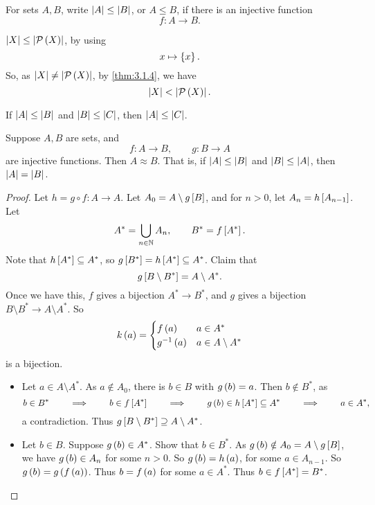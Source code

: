 
\begin{definition}
For sets $ A, B $, write $ \abs{A} \le \abs{B} $, or $ A \le B $, if there is an injective function
$$ f : A \to B. $$
\end{definition}

\begin{note*}
$ \abs{X} \le \abs{\PP\rb{X}} $, by using
$$ x \mapsto \cb{x}. $$
So, as $ \abs{X} \ne \abs{\PP\rb{X}} $, by \ref{thm:3.1.4}, we have
$$ \abs{X} < \abs{\PP\rb{X}}. $$
\end{note*}

\begin{example*}
If $ \abs{A} \le \abs{B} $ and $ \abs{B} \le \abs{C} $, then $ \abs{A} \le \abs{C} $.
\end{example*}

\pagebreak

\begin{theorem}
\label{thm:3.1.6}
Suppose $ A, B $ are sets, and
$$ f : A \to B, \qquad g : B \to A $$
are injective functions. Then $ A \approx B $. That is, if $ \abs{A} \le \abs{B} $ and $ \abs{B} \le \abs{A} $, then $ \abs{A} = \abs{B} $.
\end{theorem}

\begin{proof}
Let $ h = g \circ f : A \to A $. Let $ A_0 = A \setminus g\sb{B} $, and for $ n > 0 $, let $ A_n = h\sb{A_{n - 1}} $. Let
$$ A^* = \bigcup_{n \in \N} A_n, \qquad B^* = f\sb{A^*}. $$
Note that $ h\sb{A^*} \subseteq A^* $, so $ g\sb{B^*} = h\sb{A^*} \subseteq A^* $. Claim that
$$ g\sb{B \setminus B^*} = A \setminus A^*. $$
Once we have this, $ f $ gives a bijection $ A^* \to B^* $, and $ g $ gives a bijection $ B \setminus B^* \to A \setminus A^* $. So
$$ k\rb{a} =
\begin{cases}
f\rb{a} & a \in A^* \\
g^{-1}\rb{a} & a \in A \setminus A^*
\end{cases}
$$
is a bijection.
\begin{itemize}
\item Let $ a \in A \setminus A^* $. As $ a \notin A_0 $, there is $ b \in B $ with $ g\rb{b} = a $. Then $ b \notin B^* $, as
$$ b \in B^* \qquad \implies \qquad b \in f\sb{A^*} \qquad \implies \qquad g\rb{b} \in h\sb{A^*} \subseteq A^* \qquad \implies \qquad a \in A^*, $$
a contradiction. Thus $ g\sb{B \setminus B^*} \supseteq A \setminus A^* $.
\item Let $ b \in B $. Suppose $ g\rb{b} \in A^* $. Show that $ b \in B^* $. As $ g\rb{b} \notin A_0 = A \setminus g\sb{B} $, we have $ g\rb{b} \in A_n $ for some $ n > 0 $. So $ g\rb{b} = h\rb{a} $, for some $ a \in A_{n - 1} $. So $ g\rb{b} = g\rb{f\rb{a}} $. Thus $ b = f\rb{a} $ for some $ a \in A^* $. Thus $ b \in f\sb{A^*} = B^* $.
\end{itemize}
\end{proof}

